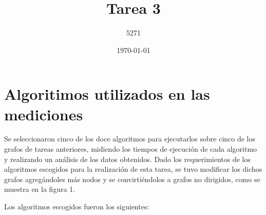 \documentclass{article}
\title{Tarea 3}
\author{5271}
\date{\today}
\begin{document}
\maketitle

\section{Algoritimos utilizados en las mediciones}
Se seleccionaron cinco de los doce algoritmos para ejecutarlos sobre cinco de los grafos de tareas anteriores, midiendo los tiempos de ejecución de cada algoritmo y realizando un análisis de los datos obtenidos. Dado los requerimientos de los algoritmos escogidos para la realización de esta tarea, se tuvo modificar los dichos grafos agregándoles más nodos y se convirtiéndolos a grafos no dirigidos, como se muestra en la figura 1.
 
Los algoritmos escogidos fueron los siguientes:
\end{document}
